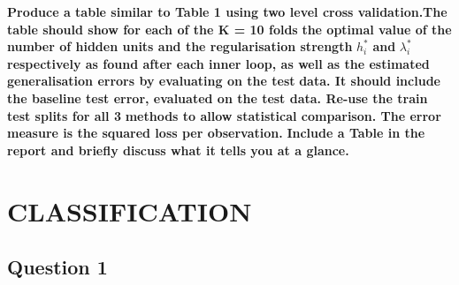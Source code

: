 \documentclass[
]{article}
\begin{document}
\textbf{Produce a table similar to Table 1 using two level cross
validation.The table should show for each of the K = 10 folds}
\textbf{the optimal value of the number of hidden units and the
regularisation strength} \(h_{i}^*%
\) \textbf{and} \(\lambda_{i}^*\) \textbf{respectively as found after
each inner loop, as well as the estimated generalisation errors by
evaluating on the test} \textbf{data. It should include the baseline
test error, evaluated on the test data. Re-use the train test splits for
all 3} \textbf{methods to allow statistical comparison. The error
measure is the squared loss per observation.} \textbf{Include a Table in
the report and briefly discuss what it tells you at a glance.}

\newpage

\hypertarget{classification}{%
\section{CLASSIFICATION}\label{classification}}

\hypertarget{question-1-2}{%
\subsection{Question 1}\label{question-1-2}}
\end{document}
